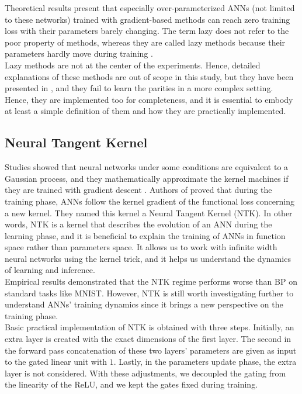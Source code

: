 \documentclass[a4paper, nobind]{templates/ociamthesis}
\begin{document}
Theoretical results present that especially over-parameterized ANNs (not limited to these networks) trained with gradient-based methods can reach zero training loss with their parameters barely changing. The term lazy does not refer to the poor property of methods, whereas they are called lazy methods because their parameters hardly move during training \cite{chizat2020lazy}.\\
Lazy methods are not at the center of the experiments. Hence, detailed explanations of these methods are out of scope in this study, but they have been presented in \cite{DBLP:journals/corr/abs-2002-07400}, and they fail to learn the parities in a more complex setting. Hence, they are implemented too for completeness, and it is essential to embody at least a simple definition of them and how they are practically implemented.

\hypertarget{neural-tangent-kernel}{%
\subsection{Neural Tangent Kernel}\label{neural-tangent-kernel}}

Studies showed that neural networks under some conditions are equivalent to a Gaussian process, and they mathematically approximate the kernel machines if they are trained with gradient descent \cite{lee2018deep, domingos2020model}. Authors of \cite{DBLP:journals/corr/abs-1806-07572} proved that during the training phase, ANNs follow the kernel gradient of the functional loss concerning a new kernel. They named this kernel a Neural Tangent Kernel (NTK). In other words, NTK is a kernel that describes the evolution of an ANN during the learning phase, and it is beneficial to explain the training of ANNs in function space rather than parameters space. It allows us to work with infinite width neural networks using the kernel trick, and it helps us understand the dynamics of learning and inference.\\
Empirical results demonstrated that the NTK regime performs worse than BP on standard tasks like MNIST. However, NTK is still worth investigating further to understand ANNs' training dynamics since it brings a new perspective on the training phase.\\
Basic practical implementation of NTK is obtained with three steps. Initially, an extra layer is created with the exact dimensions of the first layer. The second in the forward pass concatenation of these two layers' parameters are given as input to the gated linear unit with \(1\). Lastly, in the parameters update phase, the extra layer is not considered. With these adjustments, we decoupled the gating from the linearity of the ReLU, and we kept the gates fixed during training.
\end{document}
